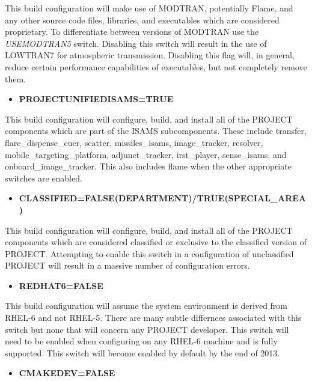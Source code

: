 \documentclass[12pt,letterpaper]{article}
\begin{document}
This build configuration will make use of MODTRAN, potentially Flame, and any other source code files, libraries, and executables which are considered proprietary.  To differentiate between versions of MODTRAN use the \emph{USEMODTRAN5} switch.  Disabling this switch will result in the use of LOWTRAN7 for atmospheric transmission.  Disabling this flag will, in general, reduce certain performance capabilities of executables, but not completely remove them.

\begin{itemize}
\item \textbf{PROJECTUNIFIEDISAMS=TRUE}
\end{itemize}

This build configuration will configure, build, and install all of the PROJECT components which are part of the ISAMS subcomponents.  These include transfer, flare\_dispense\_cuer, scatter, missiles\_isams, image\_tracker, resolver, mobile\_targeting\_platform, adjunct\_tracker, irst\_player, sense\_isams, and onboard\_image\_tracker.  This also includes flame when the other appropriate switches are enabled.

\begin{itemize}
\item \textbf{CLASSIFIED=FALSE(DEPARTMENT)/TRUE(SPECIAL_AREA)}
\end{itemize}

This build configuration will configure, build, and install all of the PROJECT components which are considered classified or exclusive to the classified version of PROJECT.  Attempting to enable this switch in a configuration of unclassified PROJECT will result in a massive number of configuration errors.

\begin{itemize}
\item \textbf{REDHAT6=FALSE}
\end{itemize}

This build configuration will assume the system environment is derived from RHEL-6 and not RHEL-5.  There are many subtle differnces associated with this switch but none that will concern any PROJECT developer.  This switch will need to be enabled when configuring on any RHEL-6 machine and is fully supported.  This switch will become enabled by default by the end of 2013.

\begin{itemize}
\item \textbf{CMAKEDEV=FALSE}
\end{itemize}
\end{document}
